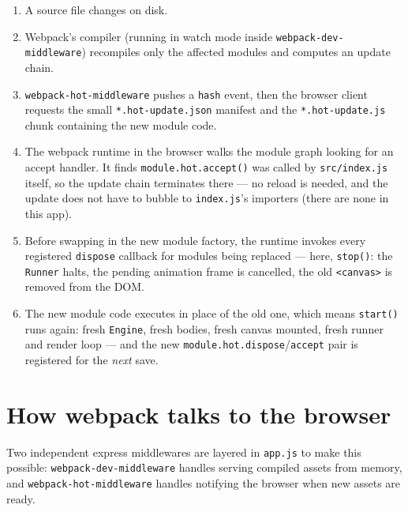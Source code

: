 \documentclass{article}
\begin{document}
\begin{enumerate}
  \item A source file changes on disk.
  \item Webpack's compiler (running in watch mode inside
    \texttt{webpack-dev-middleware}) recompiles only the affected modules
    and computes an update chain.
  \item \texttt{webpack-hot-middleware} pushes a \texttt{hash} event, then
    the browser client requests the small \texttt{*.hot-update.json}
    manifest and the \texttt{*.hot-update.js} chunk containing the new
    module code.
  \item The webpack runtime in the browser walks the module graph looking
    for an accept handler. It finds \texttt{module.hot.accept()} was called
    by \texttt{src/index.js} itself, so the update chain terminates there
    --- no reload is needed, and the update does not have to bubble to
    \texttt{index.js}'s importers (there are none in this app).
  \item Before swapping in the new module factory, the runtime invokes every
    registered \texttt{dispose} callback for modules being replaced ---
    here, \texttt{stop()}: the \texttt{Runner} halts, the pending animation
    frame is cancelled, the old \texttt{<canvas>} is removed from the DOM.
  \item The new module code executes in place of the old one, which means
    \texttt{start()} runs again: fresh \texttt{Engine}, fresh bodies, fresh
    canvas mounted, fresh runner and render loop --- and the new
    \texttt{module.hot.dispose}/\texttt{accept} pair is registered for the
    \emph{next} save.
\end{enumerate}

\section{How webpack talks to the browser}

Two independent express middlewares are layered in \texttt{app.js} to make
this possible: \texttt{webpack-dev-middleware} handles serving compiled
assets from memory, and \texttt{webpack-hot-middleware} handles notifying
the browser when new assets are ready.
\end{document}
